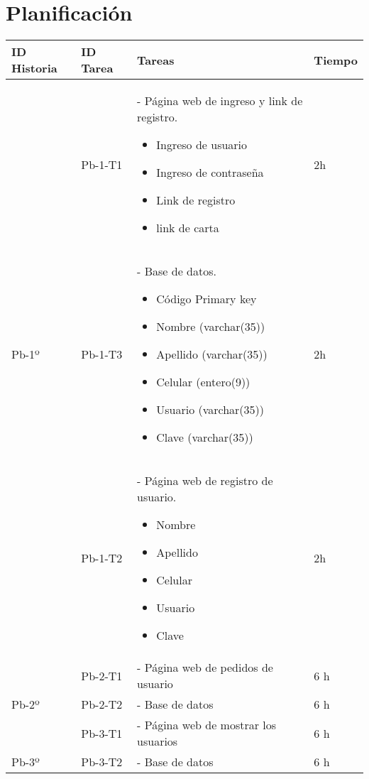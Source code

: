 \chapter{Planificación}

\begin{table}[htbp]
	\begin{center}
		\begin{tabular}{| p{2.0cm}|p{2.0cm} | p{5.5 cm} | p{3.0cm}| }
			\hline
			\centering\textbf{ID Historia} & \centering\textbf{ID Tarea}& \textbf{Tareas} & \textbf{Tiempo} 
			
			\\\hline
			
			 & \centering Pb-1-T1 & - Página web de ingreso y link de registro.
			 	 \begin{itemize}	\item Ingreso de usuario 
									\item Ingreso de contraseña	
									\item Link de registro 
									\item link de carta\end{itemize}	& 2h \\

			\centering Pb-1º & \centering Pb-1-T3 & - Base de datos.
			\begin{itemize} 
				\item Código Primary key  
				\item Nombre (varchar(35))
				\item Apellido (varchar(35))
				\item Celular (entero(9)) 
				\item Usuario (varchar(35))
				\item Clave (varchar(35)) 
			\end{itemize} & 2h
			\\ & \centering Pb-1-T2  & - Página web de registro de usuario.
			\begin{itemize}
				\item Nombre
				\item Apellido
				\item Celular
				\item Usuario
				\item Clave
			\end{itemize}   & 2h
			\\\hline
			 & \centering Pb-2-T1 & - Página web de pedidos de usuario & 6 h
			\\
			\centering Pb-2º
			& \centering Pb-2-T2 & - Base de datos & 6 h
			
			\\\hline
			& \centering Pb-3-T1 & - Página web de mostrar los usuarios & 6 h
			\\
			\centering Pb-3º
			& \centering Pb-3-T2 & - Base de datos & 6 h
			
			\\\hline

		\end{tabular}
	\end{center}
\end{table}